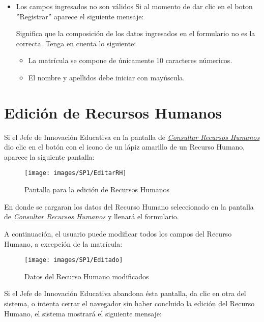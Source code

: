 \begin{itemize}
	\item Los campos ingresados no son válidos
	Si al momento de dar clic en el boton ''Registrar'' aparece el siguiente mensaje:

	Significa que la composición de los datos ingresados en el formulario no es la correcta. Tenga en cuenta lo siguiente:

	\begin{itemize}
		\item La matrícula se compone de únicamente 10 caracteres númericos.
		\item El nombre y apellidos debe iniciar con mayúscula.
	\end{itemize}


\end{itemize}

\newpage
\section{Edición de Recursos Humanos}
Si el Jefe de Innovación Educativa en la pantalla de \hyperlink{consultarrh}{\textit{Consultar Recursos Humanos}} dio clic en el botón con el icono de un lápiz amarillo de un Recurso Humano, aparece la siguiente pantalla:

\begin{figure}[!hbtp]
	\centering
	\hypertarget{editarrh}{\texttt{[image: images/SP1/EditarRH]}}
	\caption{Pantalla para la edición de Recursos Humanos}
	\label{editarrh}
\end{figure}

En donde se cargaran los datos del Recurso Humano seleccionado en la pantalla de \hyperlink{consultarrh}{\textit{Consultar Recursos Humanos}} y llenará el formulario.

A continuación, el usuario puede modificar todos los campos del Recurso Humano, a excepción de la matrícula:
\begin{figure}[!hbtp]
	\centering
	\hypertarget{modif}{\texttt{[image: images/SP1/Editado]}}
	\caption{Datos del Recurso Humano modificados}
	\label{modif}
\end{figure}

Si el Jefe de Innovación Educativa abandona ésta pantalla, da clic en otra del sistema, o intenta cerrar el navegador sin haber concluido la edición del Recurso Humano, el sistema mostrará el siguiente mensaje:

